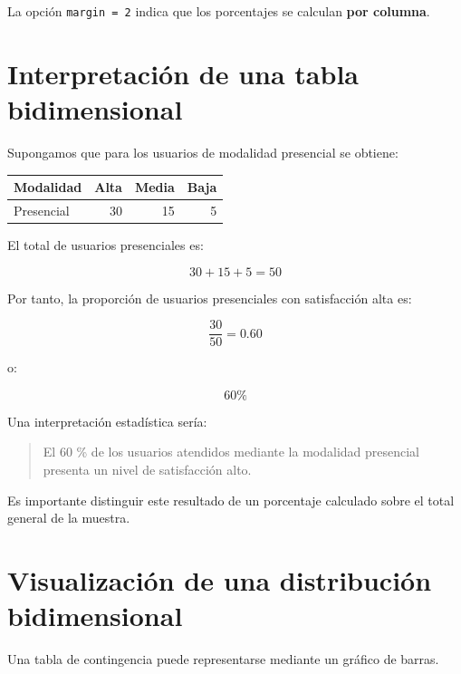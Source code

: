 \documentclass[
  spanish,
  14pt,
  letterpaper,
  DIV=11,
  numbers=noendperiod]{scrartcl}
\newcounter{none} %
\begin{document}
La opción \texttt{margin\ =\ 2} indica que los porcentajes se calculan
\textbf{por columna}.

\section{Interpretación de una tabla
bidimensional}\label{interpretaciuxf3n-de-una-tabla-bidimensional}

Supongamos que para los usuarios de modalidad presencial se obtiene:

{\def\LTcaptype{none} %
\begin{longtable}[]{@{}lrrr@{}}
\toprule\noalign{}
Modalidad & Alta & Media & Baja \\
\midrule\noalign{}
\endhead
\bottomrule\noalign{}
\endlastfoot
Presencial & 30 & 15 & 5 \\
\end{longtable}
}

El total de usuarios presenciales es:

\[
30+15+5=50
\]

Por tanto, la proporción de usuarios presenciales con satisfacción alta
es:

\[
\frac{30}{50}=0.60
\]

o:

\[
60\%
\]

Una interpretación estadística sería:

\begin{quote}
El 60 \% de los usuarios atendidos mediante la modalidad presencial
presenta un nivel de satisfacción alto.
\end{quote}

Es importante distinguir este resultado de un porcentaje calculado sobre
el total general de la muestra.

\section{Visualización de una distribución
bidimensional}\label{visualizaciuxf3n-de-una-distribuciuxf3n-bidimensional}

Una tabla de contingencia puede representarse mediante un gráfico de
barras.
\end{document}
